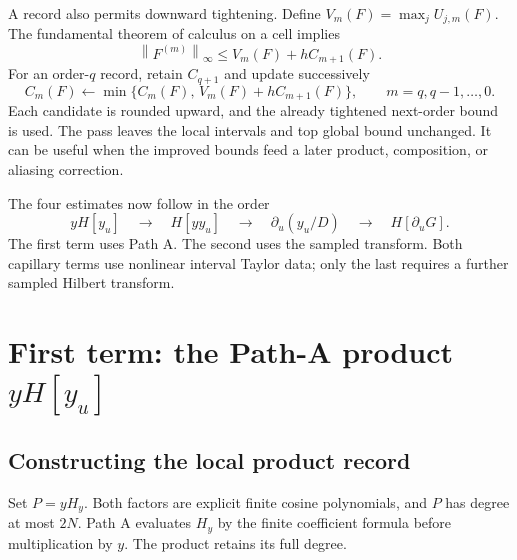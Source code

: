 \documentclass[11pt]{article}
\numberwithin{equation}{section}
\newcommand{\norm}[1]{\left\|#1\right\|_{\infty}}
\newcommand{\HH}{H_y}
\begin{document}
A record also permits downward tightening. Define
$V_m(F)=\max_j U_{j,m}(F)$. The fundamental theorem of calculus on a cell
implies
\begin{equation}
 \norm{F^{(m)}}\leq V_m(F)+hC_{m+1}(F).
 \label{eq:tightening-proof}
\end{equation}
For an order-$q$ record, retain $C_{q+1}$ and update successively
\begin{equation}
 C_m(F)\leftarrow\min\{C_m(F),\,V_m(F)+hC_{m+1}(F)\},
 \qquad m=q,q-1,\ldots,0.
 \label{eq:tightening}
\end{equation}
Each candidate is rounded upward, and the already tightened next-order
bound is used. The pass leaves the local intervals and top global bound
unchanged. It can be useful when the improved bounds feed a later product,
composition, or aliasing correction.

The four estimates now follow in the order
\begin{equation}
 yH[y_u]\quad\longrightarrow\quad H[yy_u]\quad\longrightarrow\quad
 \partial_u(y_u/D)\quad\longrightarrow\quad H[\partial_uG].
\end{equation}
The first term uses Path A. The second uses the sampled transform.
Both capillary terms use nonlinear interval Taylor data; only the last
requires a further sampled Hilbert transform.

\section{First term: the Path-A product \texorpdfstring{$yH[y_u]$}{yH[yu]}}
\label{sec:product}

\subsection{Constructing the local product record}

Set $P=y\HH$. Both factors are explicit finite cosine polynomials, and
$P$ has degree at most $2N$. Path A evaluates $\HH$ by the finite coefficient formula before
multiplication by $y$. The product retains its full degree.
\end{document}

